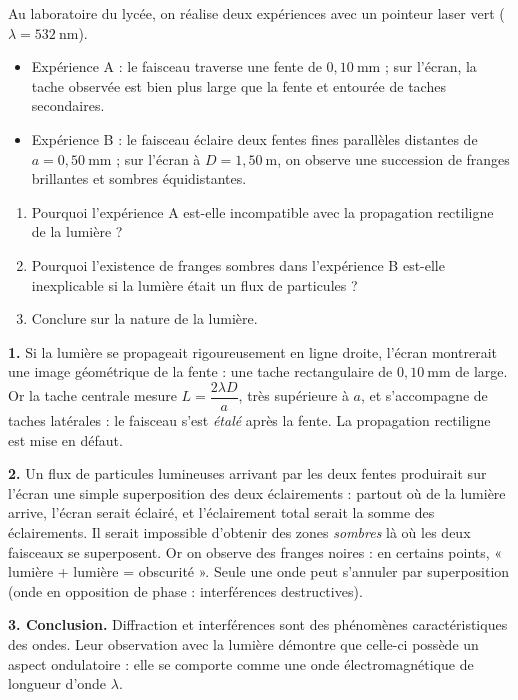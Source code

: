 \documentclass[11pt]{article}
\newcommand{\cle}[1]{{\popxbold\color{popdark}#1}}
\begin{document}
\begin{exoresolu}
Au laboratoire du lycée, on réalise deux expériences avec un pointeur laser vert ($\lambda = 532\ \text{nm}$).
\begin{itemize}
\item Expérience A : le faisceau traverse une fente de $0,10\ \text{mm}$ ; sur l'écran, la tache observée est bien plus large que la fente et entourée de taches secondaires.
\item Expérience B : le faisceau éclaire deux fentes fines parallèles distantes de $a = 0,50\ \text{mm}$ ; sur l'écran à $D = 1,50\ \text{m}$, on observe une succession de franges brillantes et sombres équidistantes.
\end{itemize}
\begin{enumerate}
\item Pourquoi l'expérience A est-elle incompatible avec la propagation rectiligne de la lumière ?
\item Pourquoi l'existence de franges sombres dans l'expérience B est-elle inexplicable si la lumière était un flux de particules ?
\item Conclure sur la nature de la lumière.
\end{enumerate}
\tcblower
\textbf{1.} Si la lumière se propageait rigoureusement en ligne droite, l'écran montrerait une image géométrique de la fente : une tache rectangulaire de $0,10\ \text{mm}$ de large. Or la tache centrale mesure $L = \dfrac{2\lambda D}{a}$, très supérieure à $a$, et s'accompagne de taches latérales : le faisceau s'est \emph{étalé} après la fente. La propagation rectiligne est mise en défaut.

\textbf{2.} Un flux de particules lumineuses arrivant par les deux fentes produirait sur l'écran une simple superposition des deux éclairements : partout où de la lumière arrive, l'écran serait éclairé, et l'éclairement total serait la somme des éclairements. Il serait impossible d'obtenir des zones \emph{sombres} là où les deux faisceaux se superposent. Or on observe des franges noires : en certains points, « lumière + lumière = obscurité ». Seule une onde peut s'annuler par superposition (onde en opposition de phase : interférences destructives).

\textbf{3. Conclusion.} Diffraction et interférences sont des phénomènes caractéristiques des ondes. Leur observation avec la lumière démontre que celle-ci possède un \cle{aspect ondulatoire} : elle se comporte comme une onde électromagnétique de longueur d'onde $\lambda$.
\end{exoresolu}
\end{document}

